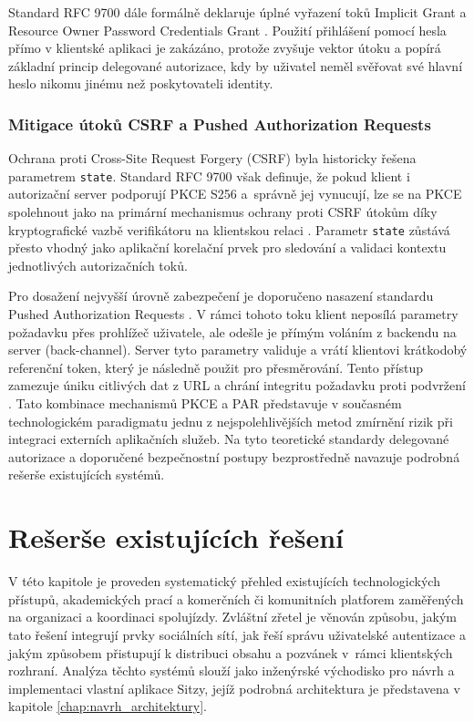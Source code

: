 \documentclass[male,czech,api_bc]{kitheses}
\begin{document}
Standard RFC 9700 dále formálně deklaruje úplné vyřazení toků Implicit Grant a Resource Owner Password Credentials Grant \cite{Lodderstedt2025}. Použití přihlášení pomocí hesla přímo v klientské aplikaci je zakázáno, protože zvyšuje vektor útoku a popírá základní princip delegované autorizace, kdy by uživatel neměl svěřovat své hlavní heslo nikomu jinému než poskytovateli identity.

\subsection{Mitigace útoků CSRF a Pushed Authorization Requests}

Ochrana proti Cross-Site Request Forgery (CSRF) byla historicky řešena parametrem \texttt{state}. Standard RFC 9700 však definuje, že pokud klient i autorizační server podporují PKCE S256 a~správně jej vynucují, lze se na PKCE spolehnout jako na primární mechanismus ochrany proti CSRF útokům díky kryptografické vazbě verifikátoru na klientskou relaci \cite{Lodderstedt2025}. Parametr \texttt{state} zůstává přesto vhodný jako aplikační korelační prvek pro sledování a validaci kontextu jednotlivých autorizačních toků.

Pro dosažení nejvyšší úrovně zabezpečení je doporučeno nasazení standardu Pushed Authorization Requests \cite{Lodderstedt2025}. V rámci tohoto toku klient neposílá parametry požadavku přes prohlížeč uživatele, ale odešle je přímým voláním z backendu na server (back-channel). Server tyto parametry validuje a vrátí klientovi krátkodobý referenční token, který je následně použit pro přesměrování. Tento přístup zamezuje úniku citlivých dat z URL a chrání integritu požadavku proti podvržení \cite{Lodderstedt2025}. Tato kombinace mechanismů PKCE a PAR představuje v současném technologickém paradigmatu jednu z nejspolehlivějších metod zmírnění rizik při integraci externích aplikačních služeb. Na tyto teoretické standardy delegované autorizace a doporučené bezpečnostní postupy bezprostředně navazuje podrobná rešerše existujících systémů.

\chapter{Rešerše existujících řešení}
\label{chap:reserse_pristupu}

V této kapitole je proveden systematický přehled existujících technologických přístupů, akademických prací a komerčních či komunitních platforem zaměřených na organizaci a koordinaci spolujízdy. Zvláštní zřetel je věnován způsobu, jakým tato řešení integrují prvky sociálních sítí, jak řeší správu uživatelské autentizace a jakým způsobem přistupují k distribuci obsahu a pozvánek v~rámci klientských rozhraní. Analýza těchto systémů slouží jako inženýrské východisko pro návrh a implementaci vlastní aplikace Sitzy, jejíž podrobná architektura je představena v kapitole \vref{chap:navrh_architektury}.
\end{document}
